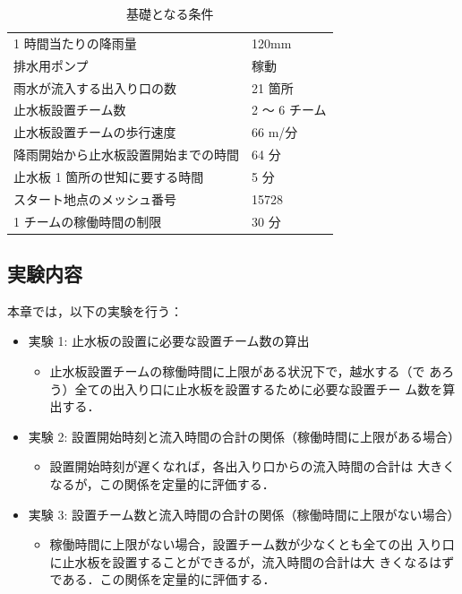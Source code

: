 \documentclass[a4paper,12pt,fleqn]{jarticle}
\begin{document}

\begin{table}[H]
  \begin{center}
    \caption{基礎となる条件}
    \begin{tabular}{ll}
      \hline
      1 時間当たりの降雨量 & 120mm \\
      排水用ポンプ & 稼動 \\
      雨水が流入する出入り口の数 & 21 箇所 \\
      止水板設置チーム数 & 2 $～$ 6 チーム \\
      止水板設置チームの歩行速度 & 66 m/分 \cite{移動速度}\\
      降雨開始から止水板設置開始までの時間 & 64 分 \\
      止水板 1 箇所の世知に要する時間 & 5 分 \\
      スタート地点のメッシュ番号 & 15728 \\
      1 チームの稼働時間の制限 & 30 分 \\
      \hline
    \end{tabular}
    \label{tb:ex1}
  \end{center}
\end{table}

\subsection{実験内容}

本章では，以下の実験を行う：
%
\begin{itemize}
 \item 実験 1: 止水板の設置に必要な設置チーム数の算出
       \begin{itemize}
	\item 止水板設置チームの稼働時間に上限がある状況下で，越水する（で
	      あろう）全ての出入り口に止水板を設置するために必要な設置チー
	      ム数を算出する．
       \end{itemize}
 \item 実験 2: 設置開始時刻と流入時間の合計の関係（稼働時間に上限がある場合）
       \begin{itemize}
	\item 設置開始時刻が遅くなれば，各出入り口からの流入時間の合計は
	      大きくなるが，この関係を定量的に評価する．
       \end{itemize}
 \item 実験 3: 設置チーム数と流入時間の合計の関係（稼働時間に上限がない場合）
       \begin{itemize}
	\item 稼働時間に上限がない場合，設置チーム数が少なくとも全ての出
	      入り口に止水板を設置することができるが，流入時間の合計は大
	      きくなるはずである．この関係を定量的に評価する．
       \end{itemize}
\end{itemize}
\end{document}
